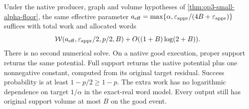 \begin{theorem}
\label{thm:op3-arithmetic-alpha-floor}
Under the native producer, graph and volume hypotheses of
\cref{thm:op3-small-alpha-floor}, the same effective parameter
$a_{\mathrm{eff}}=\max\{\alpha,\varepsilon_{\mathrm{appr}}/(4B+\varepsilon_{\mathrm{appr}})\}$ suffices
with total work and allocated words
\[
 \mathcal W(a_{\mathrm{eff}},\varepsilon_{\mathrm{appr}}/2,p/2,B)
 +O((1+B)\log(2+B)).
\]
There is no second numerical solve. On a native good execution, proper
support returns the same potential. Full support returns the native
potential plus one nonnegative constant, computed from its original
target residual. Success probability is at least $1-p/2\geq1-p$.
The extra work has no logarithmic dependence on target $1/\alpha$ in
the exact-real word model. Every output still has original support
volume at most $B$ on the good event.
\end{theorem}
